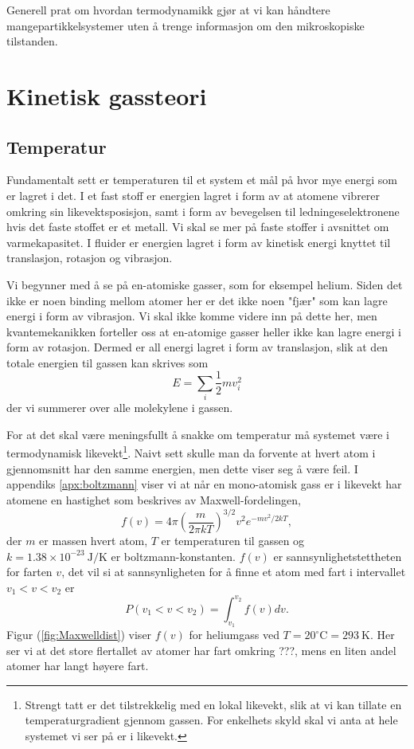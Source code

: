 \documentclass[a4paper,norsk,12pt]{article}
\def\half{\ensuremath{\frac{1}{2}}}
\begin{document}
Generell prat om hvordan termodynamikk gjør at vi kan håndtere mangepartikkelsystemer uten å trenge informasjon om den mikroskopiske tilstanden.

\section{Kinetisk gassteori}
\subsection{Temperatur}
Fundamentalt sett er temperaturen til et system et mål på hvor mye energi som er lagret i det. I et fast stoff er energien lagret i form av at atomene vibrerer omkring sin likevektsposisjon, samt i form av bevegelsen til ledningeselektronene hvis det faste stoffet er et metall. Vi skal se mer på faste stoffer i avsnittet om varmekapasitet. I fluider er energien lagret i form av kinetisk energi knyttet til translasjon, rotasjon og vibrasjon. 

Vi begynner med å se på en-atomiske gasser, som for eksempel helium. Siden det ikke er noen binding mellom atomer her er det ikke noen "fjær" som kan lagre energi i form av vibrasjon. Vi skal ikke komme videre inn på dette her, men kvantemekanikken forteller oss at en-atomige gasser heller ikke kan lagre energi i form av rotasjon. Dermed er all energi lagret i form av translasjon, slik at den totale energien til gassen kan skrives som
\begin{displaymath}
	E = \sum_i \half mv_i^2
\end{displaymath}
der vi summerer over alle molekylene i gassen.

For at det skal være meningsfullt å snakke om temperatur må systemet være i termodynamisk likevekt\footnote{Strengt tatt er det tilstrekkelig med en lokal likevekt, slik at vi kan tillate en temperaturgradient gjennom gassen. For enkelhets skyld skal vi anta at hele systemet vi ser på er i likevekt.}. Naivt sett skulle man da forvente at hvert atom i gjennomsnitt har den samme energien, men dette viser seg å være feil. I appendiks \ref{apx:boltzmann} viser vi at når en mono-atomisk gass er i likevekt har atomene en hastighet som beskrives av Maxwell-fordelingen,
\begin{displaymath}
	f(v) = 4\pi\left( \frac{m}{2\pi kT} \right)^{3/2} v^2e^{-mv^2/2kT},
\end{displaymath}
der $m$ er massen hvert atom, $T$ er temperaturen til gassen og $k = 1.38\times10^{-23}~\mathrm{J/K}$ er boltzmann-konstanten. $f(v)$ er sannsynlighetstettheten for farten $v$, det vil si at sannsynligheten for å finne et atom med fart i intervallet $v_1<v<v_2$ er
\begin{displaymath}
	P(v_1 < v < v_2) = \int_{v_1}^{v_2} f(v) dv.
\end{displaymath}
Figur (\ref{fig:Maxwelldist}) viser $f(v)$ for heliumgass ved $T=20^\circ\mathrm{C} = 293~\mathrm{K}$. Her ser vi at det store flertallet av atomer har fart omkring ???, mens en liten andel atomer har langt høyere fart. 
\end{document}
